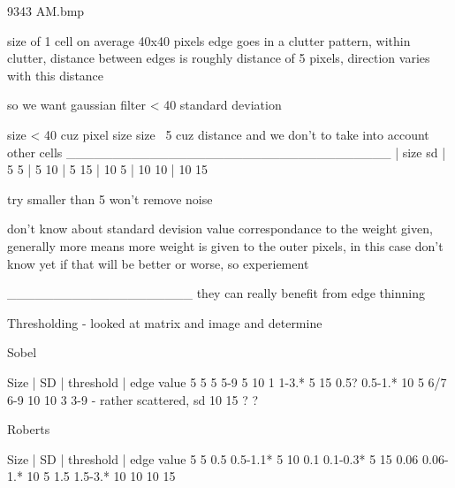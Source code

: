9343 AM.bmp

size of 1 cell on average 40x40 pixels
edge goes in a clutter pattern, within clutter, distance between edges is roughly distance of 5 pixels, direction varies with this distance

so we want gaussian filter < 40
standard deviation 


size < 40 cuz pixel size
size ~5 cuz distance and we don't to take into account other cells
___________________________________
| size          sd
|  5            5
|  5            10
|  5            15
|  10           5
|  10           10
|  10           15

try smaller than 5 won't remove noise

don't know about standard devision value correspondance to the weight given, generally more means more weight is given to the outer pixels, in this case don't know yet if that will be better or worse, so experiement


____________________
they can really benefit from edge thinning

Thresholding - looked at matrix and image and determine

Sobel

Size    |    SD    | threshold   | edge value
5            5          5            5-9
5            10         1            1-3.*
5            15         0.5?         0.5-1.*
10           5          6/7          6-9
10           10         3            3-9 - rather scattered, sd
10           15         ?             ?

Roberts

Size    |    SD    | threshold   | edge value
5            5          0.5          0.5-1.1*
5            10         0.1          0.1-0.3*
5            15         0.06         0.06-1.*
10           5          1.5          1.5-3.*
10           10         
10           15         


